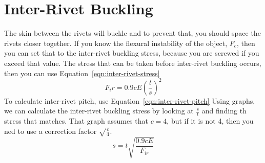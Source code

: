 \documentclass{article}
\begin{document}
\section{Inter-Rivet Buckling}
The skin between the rivets will buckle and to prevent that, you should space the rivets closer together.
If you know the flexural instability of the object, $F_c$, then you can set that to the inter-rivet buckling stress, because you are screwed if you exceed that value.
The stress that can be taken before inter-rivet buckling occurs, then you can use Equation~\ref{eqn:inter-rivet-stress}
\begin{equation}\label{eqn:inter-rivet-stress}
    F_ir = 0.9cE\left(\frac{t}{s}\right) ^ 2
\end{equation}
To calculate inter-rivet pitch, use Equation~\ref{eqn:inter-rivet-pitch}
Using graphs, we can calculate the inter-rivet buckling stress by looking at $\frac{s}{t}$ and finding th stress that matches.
That graph assumes that $c=4$, but if it is not 4, then you ned to use a correction factor $\sqrt{\frac{c}{4}}$.
\begin{equation}\label{eqn:inter-rivet-pitch}
   s = t\sqrt{\frac{0.9cE}{F_{ir}}} 
\end{equation}
\end{document}
